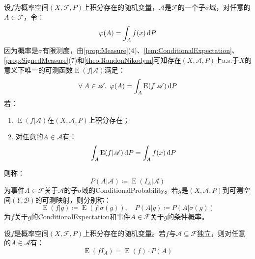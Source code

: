 \begin{definition}
	设$f$为概率空间$(X,\mathscr{F},P)$上积分存在的随机变量，$\mathscr{A}$是$\mathscr{F}$的一个子$\sigma$域，对任意的$A\in\mathscr{F}$，令：
	\begin{equation*}
		\varphi(A)=\int_{A}f(x)\mathop{}\!\mathrm{d} P
	\end{equation*}
	因为概率是$\sigma$有限测度，由\cref{prop:Measure}(4)、\cref{lem:ConditionalExpectation}、\cref{prop:SignedMeasure}(7)和\cref{theo:RandonNikodym}可知存在$(X,\mathscr{A},P)$上a.s.于$X$的意义下唯一的可测函数$\operatorname{E}(f|\mathscr{A})$满足：
	\begin{equation*}
		\forall\;A\in\mathscr{A},\;\varphi(A)=\int_{A}\operatorname{E}(f|\mathscr{A})\mathop{}\!\mathrm{d} P
	\end{equation*}
	若：
	\begin{enumerate}
		\item $\operatorname{E}(f|\mathscr{A})$在$(X,\mathscr{A},P)$上积分存在；
		\item 对任意的$A\in\mathscr{A}$有：
		\begin{equation*}
			\int_{A}\operatorname{E}(f|\mathscr{A})\mathop{}\!\mathrm{d} P=\int_{A}f(x)\mathop{}\!\mathrm{d} P
		\end{equation*}
	\end{enumerate}
	则称：
	\begin{equation*}
		P(A|\mathscr{A})\coloneq\operatorname{E}(I_A|\mathscr{A})
	\end{equation*}
	为事件$A\in\mathscr{F}$关于$\mathscr{A}$的子$\sigma$域的\gls{ConditionalProbability}。若$g$是$(X,\mathscr{A},P)$到可测空间$(Y,\mathscr{B})$的可测映射，则分别称：
	\begin{equation*}
		\operatorname{E}(f|g)\coloneq\operatorname{E}(f|\sigma(g)),\quad P(A|g)\coloneq P(A|\sigma(g))
	\end{equation*}
	为$f$关于$g$的\gls{ConditionalExpectation}和事件$A\in\mathscr{F}$关于$g$的条件概率。
\end{definition}
\begin{lemma}\label{lem:IndependentExpectation}
	设$f$是概率空间$(X,\mathscr{F},P)$上积分存在的随机变量。若$f$与$\mathscr{A}\subseteq\mathscr{F}$独立，则对任意的$A\in\mathscr{A}$有：
	\begin{equation*}
		\operatorname{E}(fI_A)=\operatorname{E}(f)\cdot P(A)
	\end{equation*}
\end{lemma}
